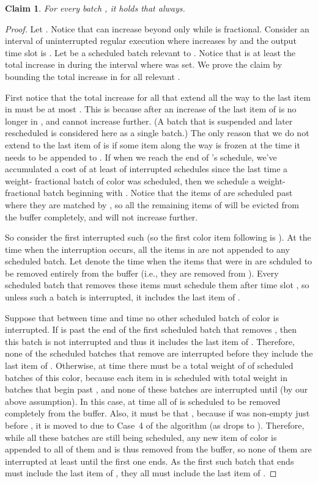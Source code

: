 \documentclass[12pt]{article}
\newtheorem{claim}[theorem]{Claim}
\begin{document}
\begin{claim}\label{cl: x-hat bounded}
For every batch , it holds that 
always.
\end{claim}

\begin{proof}
Let . Notice that  can increase beyond  only
while  is fractional.
Consider an interval  
of uninterrupted regular execution
where  increases by  and the output time slot is .
Let  be a scheduled batch relevant to . Notice that
 is at least the total increase in  during 
the interval  where  was set. We prove 
the claim by bounding the total increase in  for all 
relevant .

First notice that the total increase for all  that extend all 
the way to the last item in  must be at most . This is because after 
an increase of  the last item of  is no longer in , and 
 cannot increase further. (A batch that is suspended
and later rescheduled is considered here as a single batch.)
The only reason that we 
do not extend  to the last item of  is if some item along the 
way is frozen at the time it needs to be appended to .
If when 
we reach the end of 's schedule, we've accumulated a cost of 
at least  of interrupted schedules since the last time
a weight- fractional batch of color  was scheduled, then we schedule a 
weight- fractional batch beginning with . Notice that 
the items of  are scheduled past where they
are matched by , so all the remaining items of  will be 
evicted from the buffer completely, and  will not 
increase further. 

So consider the first interrupted such  (so the first color  
item following  is ). At the time 
when the interruption occurs, all the items in  are 
not appended to
any scheduled batch. Let  denote the time when the items
that were in  are schduled to be removed
entirely from the buffer (i.e., they are removed from ). Every
scheduled batch that removes these items must schedule them after
time slot , so unless such a batch is interrupted, it includes 
the last item of .

Suppose that between time  and time  no other scheduled
batch of color  is interrupted. If  is past the end of the first
scheduled batch that removes , then this batch is not
interrupted and thus it includes the last item of . Therefore,
none of the scheduled batches that remove  are 
interrupted before they include the last item of . Otherwise,
at time  there
must be a total weight of  of scheduled batches of this color,
because each item in  is scheduled with total weight
 in batches that begin past , and none of these batches 
are interrupted until  (by our above assumption). In
this case, at time  all of  is scheduled to
be removed completely from the buffer. Also, it must be that
, because if  was non-empty
just before , it is moved to  due to Case~4 of
the algorithm (as  drops to ). Therefore, while all
these batches are still being scheduled, any new item of color 
is appended to all of them and is thus removed from the buffer, so
none of them are interrupted at least until the first one ends. As the
first such batch that ends must include the last item of , they
all must include the last item of .


\end{proof}
\end{document}
